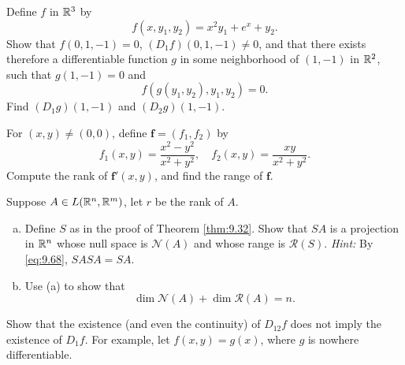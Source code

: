 \begin{myExercise}
    \label{ex:9.23}
    Define $f$ in ${\protect\mathbb R}^3$ by
    \begin{equation*}
        f(x,y_1,y_2) = x^2 y_1 + e^x + y_2 .
    \end{equation*}
    Show that $f(0, 1, -1) = 0$, $(D_1 f) (0, 1, -1) \neq 0$, 
    and that there exists therefore a differentiable function $g$ in some neighborhood of $(1, -1)$ in ${\protect\mathbb R}^2$, 
    such that $g(1, -1) = 0$ and
    \begin{equation*}
        f(g(y_1, y_2), y_1, y_2) = 0.
    \end{equation*}
    Find $(D_1 g)(1, -1)$ and $(D_2 g)(1, -1)$.
\end{myExercise}


\begin{myExercise}
    \label{ex:9.24}
    For $(x, y) \neq (0, 0)$, define $\mathbf{f} = (f_1,f_2)$ by
    \begin{equation*}
        f_1(x,y) = \frac{x^2-y^2}{x^2+y^2}, 
        \quad 
        f_2(x,y) = \frac{xy}{x^2+y^2}.
    \end{equation*}
    Compute the rank of $\mathbf{f}'(x, y)$, and find the range of $\mathbf{f}$.
\end{myExercise}


\begin{myExercise}
    \label{ex:9.25}
    Suppose $A \in L({\protect\mathbb R}^n, {\protect\mathbb R}^m)$, let $r$ be the rank of $A$.
    \begin{enumerate}[(a)]
        \item Define $S$ as in the proof of Theorem \ref{thm:9.32}. Show that $SA$ is a projection in ${\protect\mathbb R}^n$ whose null space is $\mathscr{N}(A)$ and whose range is $\mathscr{R}(S)$. \emph{Hint:} By \eqref{eq:9.68}, $SASA = SA$.
        \item Use (a) to show that 
        \begin{equation*}
            \dim \mathscr{N}(A) + \dim \mathscr{R}(A) = n.
        \end{equation*}
    \end{enumerate}
\end{myExercise}


\begin{myExercise}
    \label{ex:9.26}
    Show that the existence (and even the continuity) of $D_{12}f$ does not imply the existence of $D_1 f$. 
    For example, let $f(x, y) = g(x)$, where $g$ is nowhere differentiable.
\end{myExercise}



